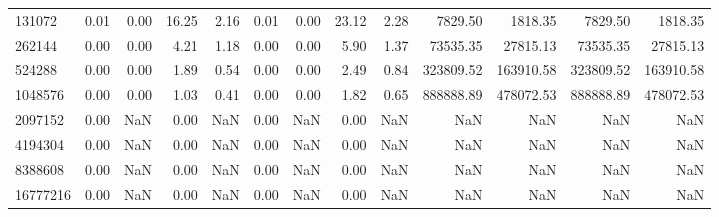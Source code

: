 \begin{tabular}{lrrrrrrrrrrrr}
131072 & 0.01 & 0.00 & 16.25 & 2.16 & 0.01 & 0.00 & 23.12 & 2.28 & 7829.50 & 1818.35 & 7829.50 & 1818.35 \\
262144 & 0.00 & 0.00 & 4.21 & 1.18 & 0.00 & 0.00 & 5.90 & 1.37 & 73535.35 & 27815.13 & 73535.35 & 27815.13 \\
524288 & 0.00 & 0.00 & 1.89 & 0.54 & 0.00 & 0.00 & 2.49 & 0.84 & 323809.52 & 163910.58 & 323809.52 & 163910.58 \\
1048576 & 0.00 & 0.00 & 1.03 & 0.41 & 0.00 & 0.00 & 1.82 & 0.65 & 888888.89 & 478072.53 & 888888.89 & 478072.53 \\
2097152 & 0.00 & NaN & 0.00 & NaN & 0.00 & NaN & 0.00 & NaN & NaN & NaN & NaN & NaN \\
4194304 & 0.00 & NaN & 0.00 & NaN & 0.00 & NaN & 0.00 & NaN & NaN & NaN & NaN & NaN \\
8388608 & 0.00 & NaN & 0.00 & NaN & 0.00 & NaN & 0.00 & NaN & NaN & NaN & NaN & NaN \\
16777216 & 0.00 & NaN & 0.00 & NaN & 0.00 & NaN & 0.00 & NaN & NaN & NaN & NaN & NaN \\
\bottomrule
\end{tabular}
